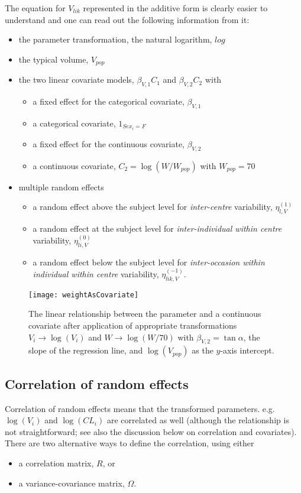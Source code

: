The equation for $V_{lik}$ represented in the additive form is clearly easier to understand and one can read out the following information from it:
\begin{itemize}
\item
the parameter transformation, the natural logarithm, $log$
\item
the typical volume, $V_{pop}$
\item
the two linear covariate models, $\beta_{V,1} C_1$ and $\beta_{V,2} C_2$ with
\begin{itemize}
\item
a fixed effect for the categorical covariate, $\beta_{V,1}$
\item
a categorical covariate, $1_{Sex_i=F}$
\item
a fixed effect for the continuous covariate, $\beta_{V,2}$
\item
a continuous covariate, $C_2 = \log(W/W_{pop})$ with $W_{pop}=70$
\end{itemize}
\item
multiple random effects
\begin{itemize}
\item
a random effect above the subject level for \textit{inter-centre} variability, $\eta_{l,V}^{(1)}$
\item
a random effect at the subject level for \textit{inter-individual within centre} variability, $\eta_{li,V}^{(0)}$
\item
a random effect below the subject level for \textit{inter-occasion within individual within centre} variability, $\eta_{lik,V}^{(-1)}$.
\end{itemize}
\end{itemize}


\begin{figure}[htbp]
\centering
 \texttt{[image: weightAsCovariate]}
\caption{The linear relationship between the parameter and a continuous covariate after application of appropriate transformations $V_i \longrightarrow \log(V_i)$ and $W \longrightarrow \log(W/70)$ with $\beta_{V,2} = \tan{\alpha}$, the slope of the regression line, and $\log(V_{pop})$ as the $y$-axis intercept.}
\label{fig:weightAsCovariate}
\end{figure}

\subsection{Correlation of random effects}
\label{subsec:correlationModel}\label{maths:param correlation}
Correlation of random effects means that the transformed parameters. e.g. $\log(V_i)$ and $\log(CL_i)$ are correlated as well (although the relationship is not straightforward; see also the discussion below on correlation and covariates). There are two alternative ways to define the correlation, using either
\begin{itemize}
\item
a correlation matrix, $R$, or
\item
a variance-covariance matrix, $\Omega$.
\end{itemize}


